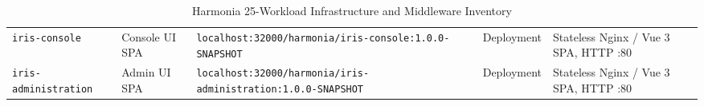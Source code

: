 \begin{table}[htbp]
\begin{tabularx}{\textwidth}{P{3.4cm} P{3.5cm} P{4.2cm} l Y}
\nolinkurl{iris-console} & Console UI SPA & \nolinkurl{localhost:32000/harmonia/iris-console:1.0.0-SNAPSHOT} & Deployment & Stateless Nginx / Vue 3 SPA, HTTP :80 \\
\nolinkurl{iris-administration} & Admin UI SPA & \nolinkurl{localhost:32000/harmonia/iris-administration:1.0.0-SNAPSHOT} & Deployment & Stateless Nginx / Vue 3 SPA, HTTP :80 \\
\bottomrule
\end{tabularx}
\caption{Harmonia 25-Workload Infrastructure and Middleware Inventory}
\label{tab:system_inventory_workloads}
\end{table}

\newpage
